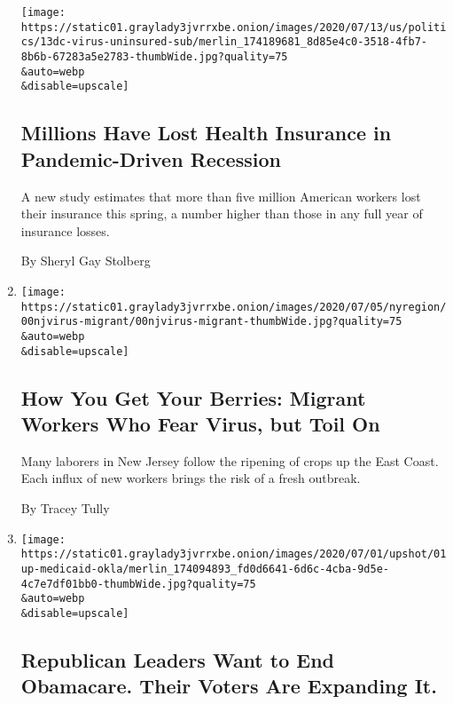 \begin{enumerate}
  \texttt{[image: https://static01.graylady3jvrrxbe.onion/images/2020/07/13/us/politics/13dc-virus-uninsured-sub/merlin\_174189681\_8d85e4c0-3518-4fb7-8b6b-67283a5e2783-thumbWide.jpg?quality=75\\\&auto=webp\\\&disable=upscale]}

  \hypertarget{millions-have-lost-health-insurance-in-pandemic-driven-recession}{%
  \subsection{Millions Have Lost Health Insurance in Pandemic-Driven
  Recession}\label{millions-have-lost-health-insurance-in-pandemic-driven-recession}}

  A new study estimates that more than five million American workers
  lost their insurance this spring, a number higher than those in any
  full year of insurance losses.

  By Sheryl Gay Stolberg
\item
  \href{/2020/07/05/nyregion/nj-migrant-workers-covid-19.html}{}

  \texttt{[image: https://static01.graylady3jvrrxbe.onion/images/2020/07/05/nyregion/00njvirus-migrant/00njvirus-migrant-thumbWide.jpg?quality=75\\\&auto=webp\\\&disable=upscale]}

  \hypertarget{how-you-get-your-berries-migrant-workers-who-fear-virus-but-toil-on}{%
  \subsection{How You Get Your Berries: Migrant Workers Who Fear Virus,
  but Toil
  On}\label{how-you-get-your-berries-migrant-workers-who-fear-virus-but-toil-on}}

  Many laborers in New Jersey follow the ripening of crops up the East
  Coast. Each influx of new workers brings the risk of a fresh outbreak.

  By Tracey Tully
\item
  \href{/2020/07/01/upshot/oklahoma-obamacare-Republican-voters-expand.html}{}

  \texttt{[image: https://static01.graylady3jvrrxbe.onion/images/2020/07/01/upshot/01up-medicaid-okla/merlin\_174094893\_fd0d6641-6d6c-4cba-9d5e-4c7e7df01bb0-thumbWide.jpg?quality=75\\\&auto=webp\\\&disable=upscale]}

  \hypertarget{republican-leaders-want-to-end-obamacare-their-voters-are-expanding-it}{%
  \subsection{Republican Leaders Want to End Obamacare. Their Voters Are
  Expanding
  It.}\label{republican-leaders-want-to-end-obamacare-their-voters-are-expanding-it}}


\end{enumerate}
